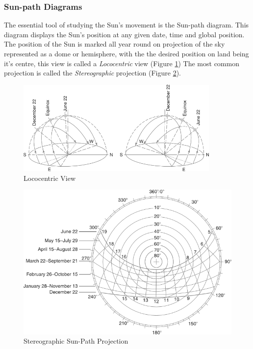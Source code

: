 \subsubsection{Sun-path Diagrams}
The essential tool of studying the Sun's movement is the Sun-path diagram. This diagram displays the
Sun's position at any given date, time and global position. The position of the Sun is marked all
year round on projection of the sky represented as a dome or hemisphere, with the the desired
position on land being it's centre, this view is called a \emph{Lococentric} view (Figure
\ref{Lococentric}) The most common projection is called the \emph{Stereographic} projection (Figure
\ref{Stereographic}).

\begin{figure}[htbp]
\centering
\includegraphics[width=10cm]{./Images/3-Lococentric}
\caption[Lococentric Sun Path View]{Lococentric View \cite{szokolay08}}
\label{Lococentric}
\end{figure}

\begin{figure}[htbp]
\includegraphics[width=\textwidth]{./Images/4-Stereographic}
\caption[Stereographic Sun-Path Projection] {Stereographic Sun-Path Projection \cite{szokolay08}}
\label{Stereographic}
\end{figure}

